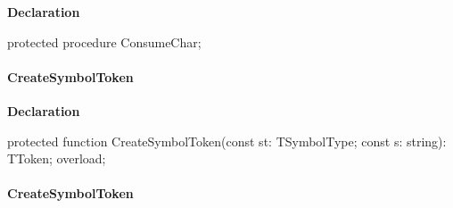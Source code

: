\documentclass{report}
\newif\ifpdf
\begin{document}
\label{PasDoc_Tokenizer.TTokenizer-ConsumeChar}
\begin{list}{}{
\setlength{\itemindent}{0cm}
\setlength{\listparindent}{0cm}
\setlength{\leftmargin}{\evensidemargin}
\addtolength{\leftmargin}{\tmplength}
\settowidth{\labelsep}{X}
\addtolength{\leftmargin}{\labelsep}
\setlength{\labelwidth}{\tmplength}
}
\item[\textbf{Declaration}\hfill]
\ifpdf
\begin{flushleft}
\fi
\begin{ttfamily}
protected procedure ConsumeChar;\end{ttfamily}

\ifpdf
\end{flushleft}
\fi

\end{list}
\paragraph*{CreateSymbolToken}\hspace*{\fill}

\label{PasDoc_Tokenizer.TTokenizer-CreateSymbolToken}
\begin{list}{}{
\setlength{\itemindent}{0cm}
\setlength{\listparindent}{0cm}
\setlength{\leftmargin}{\evensidemargin}
\addtolength{\leftmargin}{\tmplength}
\settowidth{\labelsep}{X}
\addtolength{\leftmargin}{\labelsep}
\setlength{\labelwidth}{\tmplength}
}
\item[\textbf{Declaration}\hfill]
\ifpdf
\begin{flushleft}
\fi
\begin{ttfamily}
protected function CreateSymbolToken(const st: TSymbolType; const s: string): TToken; overload;\end{ttfamily}

\ifpdf
\end{flushleft}
\fi

\end{list}
\paragraph*{CreateSymbolToken}\hspace*{\fill}
\end{document}
